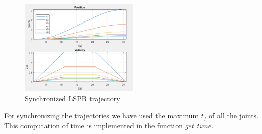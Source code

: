 \begin{figure}[H]
    \centering
    \includegraphics[width=0.5\textwidth]{images/lspb_trajectory.png}
    \caption{Synchronized LSPB trajectory}
    \label{fig:lspb_trajectory}
\end{figure}
For synchronizing the trajectories we have used the maximum $t_f$ of all the joints. 
This computation of time is implemented in the function $get\_time$.

